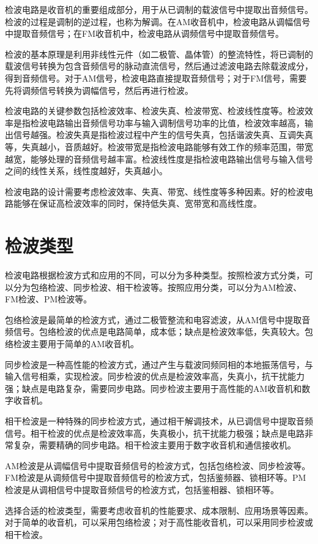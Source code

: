 \documentclass[12pt,UTF8]{ctexbook}
\begin{document}
检波电路是收音机的重要组成部分，用于从已调制的载波信号中提取出音频信号。检波的过程是调制的逆过程，也称为解调。在AM收音机中，检波电路从调幅信号中提取音频信号；在FM收音机中，检波电路从调频信号中提取音频信号。

检波的基本原理是利用非线性元件（如二极管、晶体管）的整流特性，将已调制的载波信号转换为包含音频信号的脉动直流信号，然后通过滤波电路去除载波成分，得到音频信号。对于AM信号，检波电路直接提取音频信号；对于FM信号，需要先将调频信号转换为调幅信号，然后再进行检波。

检波电路的关键参数包括检波效率、检波失真、检波带宽、检波线性度等。检波效率是指检波电路输出音频信号功率与输入调制信号功率的比值，检波效率越高，输出信号越强。检波失真是指检波过程中产生的信号失真，包括谐波失真、互调失真等，失真越小，音质越好。检波带宽是指检波电路能够有效工作的频率范围，带宽越宽，能够处理的音频信号越丰富。检波线性度是指检波电路输出信号与输入信号之间的线性关系，线性度越好，失真越小。

检波电路的设计需要考虑检波效率、失真、带宽、线性度等多种因素。好的检波电路能够在保证高检波效率的同时，保持低失真、宽带宽和高线性度。

\section{检波类型}

检波电路根据检波方式和应用的不同，可以分为多种类型。按照检波方式分类，可以分为包络检波、同步检波、相干检波等。按照应用分类，可以分为AM检波、FM检波、PM检波等。

包络检波是最简单的检波方式，通过二极管整流和电容滤波，从AM信号中提取音频信号。包络检波的优点是电路简单，成本低；缺点是检波效率低，失真较大。包络检波主要用于简单的AM收音机。

同步检波是一种高性能的检波方式，通过产生与载波同频同相的本地振荡信号，与输入信号相乘，实现检波。同步检波的优点是检波效率高，失真小，抗干扰能力强；缺点是电路复杂，需要同步电路。同步检波主要用于高性能的AM收音机和数字收音机。

相干检波是一种特殊的同步检波方式，通过相干解调技术，从已调信号中提取音频信号。相干检波的优点是检波效率高，失真极小，抗干扰能力极强；缺点是电路非常复杂，需要精确的同步电路。相干检波主要用于数字收音机和通信接收机。

AM检波是从调幅信号中提取音频信号的检波方式，包括包络检波、同步检波等。FM检波是从调频信号中提取音频信号的检波方式，包括鉴频器、锁相环等。PM检波是从调相信号中提取音频信号的检波方式，包括鉴相器、锁相环等。

选择合适的检波类型，需要考虑收音机的性能要求、成本限制、应用场景等因素。对于简单的收音机，可以采用包络检波；对于高性能收音机，可以采用同步检波或相干检波。
\end{document}
